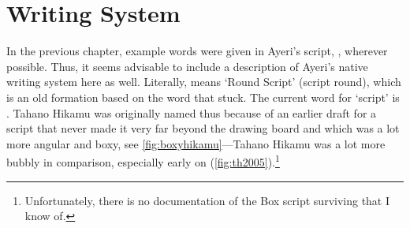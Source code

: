 
\chapter{Writing System}

In the previous chapter, example words were given in Ayeri's script, , wherever possible. Thus, it seems advisable to include a 
description of Ayeri's native writing system here as well. Literally, 
 means `Round Script' (script round), which is 
an old formation based on the word  that  stuck. The 
current word for `script' is . Tahano Hikamu was 
originally named thus because of an earlier draft for a script that never made 
it very far beyond the drawing board and which was a lot more angular and boxy, 
see \autoref{fig:boxyhikamu}---Tahano Hikamu was a lot more bubbly in 
comparison, especially early on (\autoref{fig:th2005}).\footnote{Unfortunately, 
there is no documentation of the Box script surviving that I know 
of.}

